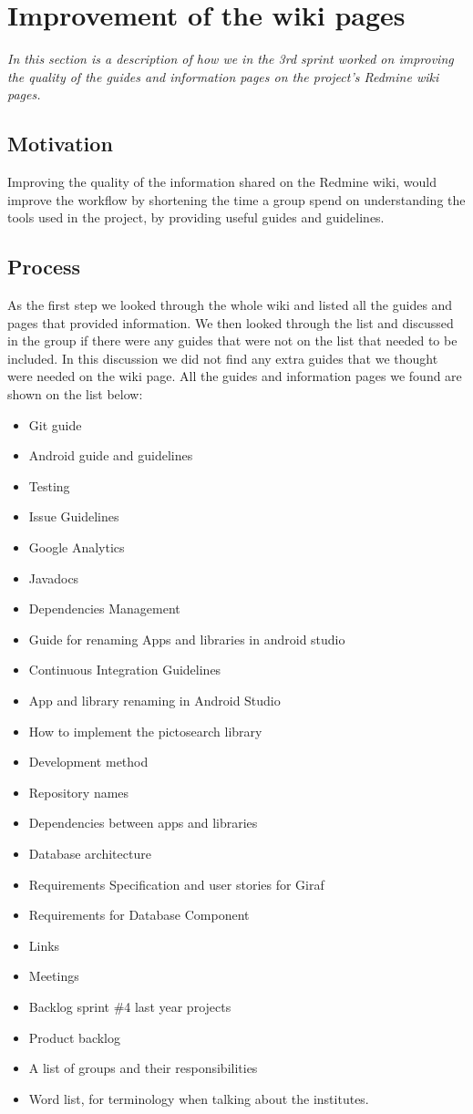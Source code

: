 \section{Improvement of the wiki pages}
\textit{In this section is a description of how we in the 3rd sprint worked on improving the quality of the guides and information pages on the project’s Redmine wiki pages.}

\subsection{Motivation}
Improving the quality of the information shared on the Redmine wiki, would improve the workflow by shortening the time a group spend on understanding the tools used in the project, by providing useful guides and guidelines.

\subsection{Process}
As the first step we looked through the whole wiki and listed all the guides and pages that provided information. We then looked through the list and discussed in the group if there were any guides that were not on the list that needed to be included. In this discussion we did not find any extra guides that we thought were needed on the wiki page. All the guides and information pages we found are shown on the list below:

\begin{itemize}
	\item Git guide
	\item Android guide and guidelines
	\item Testing
	\item Issue Guidelines
	\item Google Analytics
	\item Javadocs 
	\item Dependencies Management
	\item Guide for renaming Apps and libraries in android studio
	\item Continuous Integration Guidelines
	\item App and library renaming in Android Studio
	\item How to implement the pictosearch library
	\item Development method
	\item Repository names
	\item Dependencies between apps and libraries
	\item Database architecture
	\item Requirements Specification and user stories for Giraf
	\item Requirements for Database Component
	\item Links
	\item Meetings
	\item Backlog sprint \#4 last year projects
	\item Product backlog
	\item A list of groups and their responsibilities
	\item Word list, for terminology when talking about the institutes.
\end{itemize}

